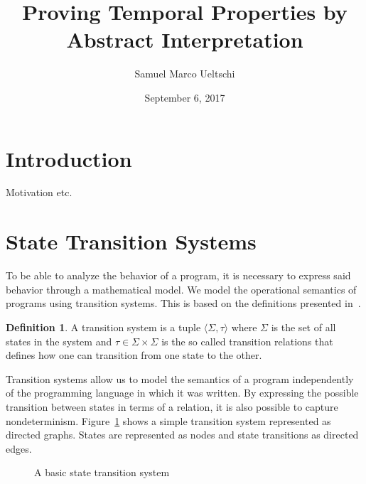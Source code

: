 \documentclass[11pt,a4paper,titlepage]{article}
\title{Proving Temporal Properties by Abstract Interpretation}
\date{September 6, 2017}
\author{Samuel Marco Ueltschi}
\theoremstyle{definition}
\newtheorem{definition}{Definition}[section]
\begin{document}
\maketitle

\tableofcontents
\clearpage

\section{Introduction}
 
Motivation etc.


\section{State Transition Systems}

To be able to analyze the behavior of a program, it is necessary 
to express said behavior through a mathematical model. 
We model the operational semantics of programs using transition systems. 
This is based on the definitions presented in~\cite{UrbanM-VMCAI15}.

\begin{definition}
    A transition system is a tuple $\langle \Sigma, \tau \rangle$ where $\Sigma$ 
    is the set of all states in the system and $\tau \in \Sigma \times \Sigma$ 
    is the so called transition relations that defines how one can transition from one state to the other.
\end{definition}

Transition systems allow us to model the semantics of a program 
independently of the programming language in which it was written. 
By expressing the possible transition between states in terms of a relation, 
it is also possible to capture nondeterminism. Figure~\ref{fig:basic_transition_system} 
shows a simple transition system represented as directed graphs. States are represented as nodes
and state transitions as directed edges.
\\

\begin{figure}
\centering
{}
\caption{A basic state transition system} 
\label{fig:basic_transition_system}
\end{figure}
\end{document}
